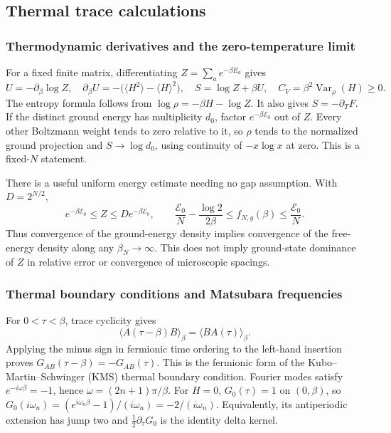 \documentclass[11pt]{article}
\numberwithin{equation}{section}
\theoremstyle{exposition}
\theoremstyle{result}
\begin{document}
\subsection{Thermal trace calculations}\label{app:thermalDetails}

\subsubsection{Thermodynamic derivatives and the zero-temperature limit}
For a fixed finite matrix, differentiating $Z=\sum_a e^{-\beta E_a}$ gives
\begin{equation*}
U=-\partial_\beta\log Z,\quad
\partial_\beta U=-\bigl(\langle H^2\rangle-\langle H\rangle^2\bigr),\quad
S=\log Z+\beta U,\quad C_V=\beta^2\operatorname{Var}_\rho(H)\geq0.
\end{equation*}
The entropy formula follows from $\log\rho=-\beta H-\log Z$. It also gives $S=-\partial_TF$. If the distinct ground energy has multiplicity $d_0$, factor $e^{-\beta\mathcal E_0}$ out of $Z$. Every other Boltzmann weight tends to zero relative to it, so $\rho$ tends to the normalized ground projection and $S\to\log d_0$, using continuity of $-x\log x$ at zero. This is a fixed-$N$ statement.

There is a useful uniform energy estimate needing no gap assumption. With $D=2^{N/2}$,
\begin{equation*}
e^{-\beta\mathcal E_0}\leq Z\leq D e^{-\beta\mathcal E_0},\qquad
\frac{\mathcal E_0}{N}-\frac{\log2}{2\beta}
\leq f_{N,g}(\beta)\leq\frac{\mathcal E_0}{N}.
\end{equation*}
Thus convergence of the ground-energy density implies convergence of the free-energy density along any $\beta_N\to\infty$. This does not imply ground-state dominance of $Z$ in relative error or convergence of microscopic spacings.

\subsubsection{Thermal boundary conditions and Matsubara frequencies}
For $0<\tau<\beta$, trace cyclicity gives
\begin{equation*}
\langle A(\tau-\beta)B\rangle_\beta
=\langle BA(\tau)\rangle_\beta.
\end{equation*}
Applying the minus sign in fermionic time ordering to the left-hand insertion proves $G_{AB}(\tau-\beta)=-G_{AB}(\tau)$. This is the fermionic form of the Kubo--Martin--Schwinger (KMS) thermal boundary condition. Fourier modes satisfy $e^{-i\omega\beta}=-1$, hence $\omega=(2n+1)\pi/\beta$. For $H=0$, $G_0(\tau)=1$ on $(0,\beta)$, so $G_0(i\omega_n)=(e^{i\omega_n\beta}-1)/(i\omega_n)=-2/(i\omega_n)$. Equivalently, its antiperiodic extension has jump two and $\tfrac12\partial_\tau G_0$ is the identity delta kernel.
\end{document}

